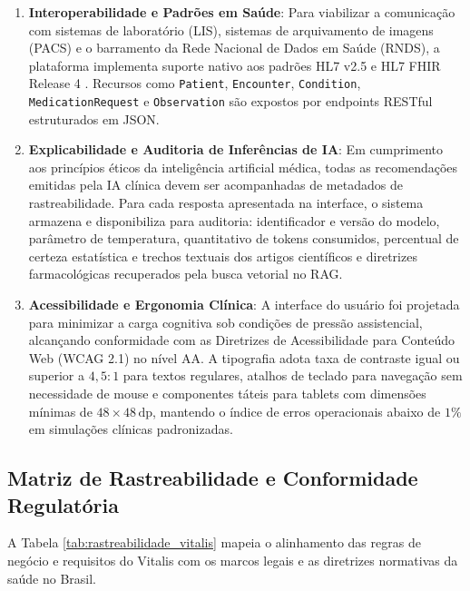 \begin{enumerate}[label=\textbf{RNF-\arabic*:}, leftmargin=*]
    \item \textbf{Interoperabilidade e Padrões em Saúde}:
    Para viabilizar a comunicação com sistemas de laboratório (LIS), sistemas de arquivamento de imagens (PACS) e o barramento da Rede Nacional de Dados em Saúde (RNDS), a plataforma implementa suporte nativo aos padrões HL7 v2.5 e HL7 FHIR Release 4 \cite{hl7_fhir:2019}. Recursos como \texttt{Patient}, \texttt{Encounter}, \texttt{Condition}, \texttt{MedicationRequest} e \texttt{Observation} são expostos por endpoints RESTful estruturados em JSON.

    \item \textbf{Explicabilidade e Auditoria de Inferências de IA}:
    Em cumprimento aos princípios éticos da inteligência artificial médica, todas as recomendações emitidas pela IA clínica devem ser acompanhadas de metadados de rastreabilidade. Para cada resposta apresentada na interface, o sistema armazena e disponibiliza para auditoria: identificador e versão do modelo, parâmetro de temperatura, quantitativo de tokens consumidos, percentual de certeza estatística e trechos textuais dos artigos científicos e diretrizes farmacológicas recuperados pela busca vetorial no RAG.

    \item \textbf{Acessibilidade e Ergonomia Clínica}:
    A interface do usuário foi projetada para minimizar a carga cognitiva sob condições de pressão assistencial, alcançando conformidade com as Diretrizes de Acessibilidade para Conteúdo Web (WCAG 2.1) no nível AA. A tipografia adota taxa de contraste igual ou superior a $4{,}5:1$ para textos regulares, atalhos de teclado para navegação sem necessidade de mouse e componentes táteis para tablets com dimensões mínimas de $48 \times 48\,\text{dp}$, mantendo o índice de erros operacionais abaixo de $1\%$ em simulações clínicas padronizadas.
\end{enumerate}

\subsection{Matriz de Rastreabilidade e Conformidade Regulatória}

A Tabela \ref{tab:rastreabilidade_vitalis} mapeia o alinhamento das regras de negócio e requisitos do Vitalis com os marcos legais e as diretrizes normativas da saúde no Brasil.

